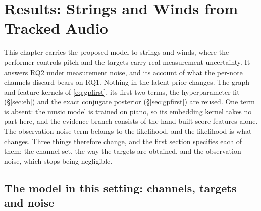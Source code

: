 \documentclass[11pt,a4paper]{report}
\begin{document}

\chapter{Results: Strings and Winds from Tracked Audio}
\label{ch:phase2}\label{sec:phase2}
This chapter carries the proposed model to strings and winds, where the
performer controls pitch and the targets carry real measurement
uncertainty. It answers RQ2 under measurement noise, and its account of
what the per-note channels discard bears on RQ1. Nothing in the latent
prior changes. The graph and feature kernels of
\eqref{eq:gpfirst}, its first two terms, the hyperparameter fit
(\S\ref{sec:eb}) and the exact conjugate posterior (\S\ref{sec:gpfirst})
are reused. One term is absent: the music model is trained on piano, so
its embedding kernel takes no part here, and the evidence branch consists
of the hand-built score features alone. The observation-noise term belongs
to the likelihood, and the likelihood is what changes. Three things
therefore change, and the first section specifies each of them: the
channel set, the way the targets are obtained, and the observation noise,
which stops being negligible.


\section{The model in this setting: channels, targets and noise}
\label{sec:phase2-delta}
\end{document}
